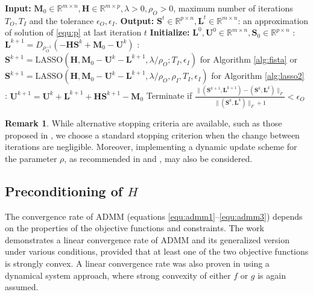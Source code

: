 \documentclass[10pt]{article}  	%
\theoremstyle{definition}
\theoremstyle{definition}
\newtheorem{remark}[theorem]{Remark}
\newcommand{\R}{{\mathbb{R}}}
\newcommand{\mH}{\mathbf{H}}
\newcommand{\mL}{\mathbf{L}}
\newcommand{\mM}{\mathbf{M}}
\newcommand{\mS}{\mathbf{S}}
\newcommand{\mU}{\mathbf{U}}
\theoremstyle{remark}
\begin{document}
\begin{algorithm}[htb]
\caption{Generalized Matrix Separation: GMS$(\mM_0, \mH, \lambda; \rho_O, T_O, T_I, \epsilon_O, \epsilon_I)$}\label{alg:gms}
\begin{algorithmic}
\State\textbf{Input:} $\mM_0\in\R^{m\times n}, \mH\in\R^{m\times p},  \lambda >0, \rho_O>0$, maximum number of iterations $T_O, T_I$ and the tolerance $\epsilon_O, \epsilon_I$.
\State\textbf{Output:} $\mS^{t} \in \R^{p\times n}, \mL^{t}\in\R^{m\times n}$: an approximation of solution of \eqref{equ:p} at last iteration $t$
\State\textbf{Initialize:} $\mL^0,\mU^0\in\R^{m\times n}, \mS_0 \in \R^{p \times n}$
: $ \mL^{k+1} = D_{\rho_O^{-1}}(-\mH\mS^k+\mM_0-\mU^k)$
: $\mS^{k+1} = \text{LASSO}(\mH, \mM_0 -\mU^k-\mL^{k+1}, \lambda/\rho_O; T_I, \epsilon_I) $ for Algorithm \ref{alg:fista} or 
\State \hspace{0.11in} $\mS^{k+1} = \text{LASSO}(\mH, \mM_0 -\mU^k-\mL^{k+1}, \lambda/\rho_O, \rho_I, T_I, \epsilon_I) $ for Algorithm \ref{alg:lasso2}
: $\mU^{k+1} = \mU^k + \mL^{k+1} +\mH\mS^{k+1}-\mM_0 $
\State Terminate if $\frac{\| (\mS^{k+1}, \mL^{k+1}) - (\mS^k, \mL^k) \|_F}{\|(\mS^k, \mL^k)\|_F + 1} <\epsilon_O$ 
\EndFor
\end{algorithmic}
\end{algorithm}

\begin{remark}
While alternative stopping criteria are available, such as those proposed in \cite{BS11}, 
we choose a standard stopping criterion when the change between iterations are negligible. 
Moreover, implementing a dynamic update scheme for the parameter $\rho$, as recommended in \cite{BS11} and \cite{GE14}, may also be considered.
\end{remark}

\subsection{Preconditioning of $H$}\label{sec:prec}

The convergence rate of ADMM (equations \eqref{equ:admm1}--\eqref{equ:admm3}) depends on the properties of the objective functions and constraints. The work \cite{DY16} demonstrates a linear convergence rate of ADMM and its generalized version under various conditions, provided that at least one of the two objective functions is strongly convex. A linear convergence rate was also proven in \cite{admm_par} using a dynamical system approach, where strong convexity of either $f$ or $g$ is again assumed.
\end{document}
